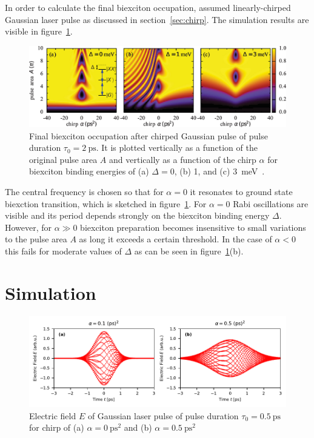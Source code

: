 In order to calculate the final biexciton occupation, \textcite{glassl_biexciton_2013} assumed linearly-chirped Gaussian laser pulse as discussed in section~\ref{sec:chirp}.
The simulation results are visible in figure~\ref{fig:biexciton-occupation}.
\begin{figure}[H]
	\centering
	\includegraphics[width=\linewidth]{figures/chirp/biexciton-occupation}
	\caption{Final biexciton occupation after chirped Gaussian pulse of pulse duration $\tau_0 = \SI{2}{\pico \second}$.
		It is plotted vertically as a function of the original pulse area $A$ and vertically as a function of the chirp $\alpha$ for biexciton binding energies of (a) $\Delta=0$, (b) 1, and (c) \SI{3}{\milli \electronvolt}~\cite{glassl_biexciton_2013}.}
	\label{fig:biexciton-occupation}
\end{figure}
The central frequency is chosen so that for $\alpha=0$ it resonates to ground state biexction transition, which is sketched in figure~\ref{fig:biexciton-occupation}.
For $\alpha=0$ Rabi oscillations are visible and its period depends strongly on the biexciton binding energy $\Delta$.
However, for $\alpha \gg 0$ biexciton preparation becomes insensitive to small variations to the pulse area $A$ as long it exceeds a certain threshold.
In the case of $\alpha < 0$ this fails for moderate values of $\Delta$ as can be seen in figure~\ref{fig:biexciton-occupation}(b).


\section{Simulation}

\begin{figure}[H]
	\centering
	\includegraphics[width=\linewidth]{figures/chirp/plots/chirped_laser_pulse}
	\caption{Electric field $E$ of Gaussian laser pulse of pulse duration $\tau_0=\SI{0.5}{\pico \second}$ for chirp of (a) $\alpha = \SI{0}{\pico \second \squared}$ and (b) $\alpha = \SI{0.5}{\pico \second \squared}$}
	\label{fig:chirpedlaserpulse}
\end{figure}


